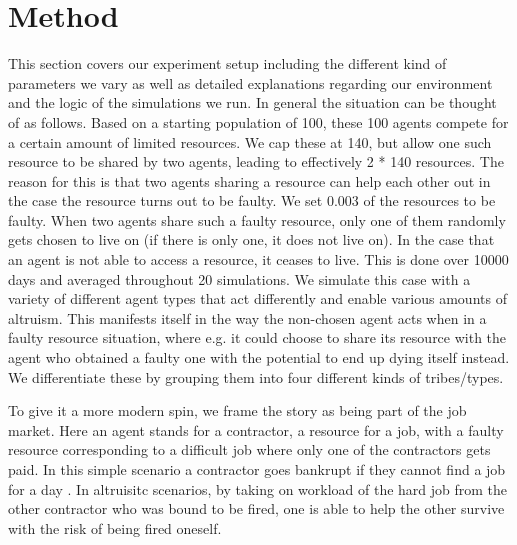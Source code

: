 \documentclass[sigconf]{acmart}
\newcommand{\todo}[1]{{\color{red}{#1}}}
\newcommand{\VNumSimulations}{20\xspace}
\newcommand{\VNumDays}{10000\xspace}
\newcommand{\VNumPop}{100\xspace}
\newcommand{\VNumTrees}{140\xspace}
\newcommand{\VProbPredator}{0.003\xspace}
\begin{document}
    \section{Method}\label{sec:method}
    This section covers our experiment setup including the different kind of parameters we vary as well as detailed explanations regarding our environment and the logic of the simulations we run.
    In general the situation can be thought of as follows.
    Based on a starting population of \VNumPop, these \VNumPop agents compete for a certain amount of limited resources.
    We cap these at \VNumTrees, but allow one such resource to be shared by two agents, leading to effectively 2 * \VNumTrees resources.
    The reason for this is that two agents sharing a resource can help each other out in the case the resource turns out to be faulty.
    We set \VProbPredator of the resources to be faulty.
    When two agents share such a faulty resource, only one of them randomly gets chosen to live on (if there is only one, it does not live on).
    In the case that an agent is not able to access a resource, it ceases to live.
    This is done over \VNumDays days and averaged throughout \VNumSimulations simulations.
    We simulate this case with a variety of different agent types that act differently and enable various amounts of altruism.
    This manifests itself in the way the non-chosen agent acts when in a faulty resource situation, where e.g. it could choose to share its resource with the agent who obtained a faulty one with the potential to end up dying itself instead.
    We differentiate these by grouping them into four different kinds of tribes/types.

    To give it a more modern spin, we frame the story as being part of the job market.
    Here an agent stands for a contractor, a resource for a job, with a faulty resource corresponding to a difficult job where only one of the contractors gets paid.
    In this simple scenario a contractor goes bankrupt if they cannot find a job for a day \todo{and when simulating the stable population, agents are not able to finish the job on time and both get fired}.
    In altruisitc scenarios, by taking on workload of the hard job from the other contractor who was bound to be fired, one is able to help the other survive with the risk of being fired oneself.

    \todo{Add code step by step, or config for each experiment in the appendix, whole code in general in the appendix}
\end{document}
